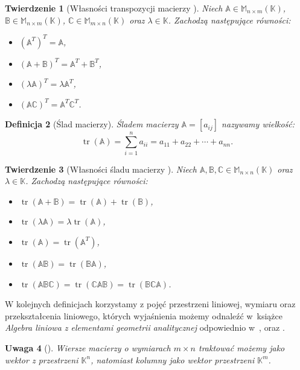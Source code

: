 \documentclass[12pt,a4paper]{report}
\newtheorem{df}{Definicja}[chapter]
\newtheorem{tw}[df]{Twierdzenie}
\newtheorem{uwaga}[df]{Uwaga}
\newcommand{\setK}{\mathbb{K}}
\newcommand{\tr}[1]{\operatorname{tr}\left({#1} \right)}
\begin{document}
\begin{tw}[Własności transpozycji macierzy {\citep[Sec 5.1 Tw. 5.1]{ealIII}}]
Niech $\mathbb{A} \in \mathbb{M}_{n \times m} (\setK)$, $\mathbb{B} \in \mathbb{M}_{n \times m} (\setK)$, $\mathbb{C} \in \mathbb{M}_{m \times n} (\setK)$ oraz $\lambda \in \setK$.
Zachodzą następujące równości:
\begin{itemize}
\item $(\mathbb{A}^T)^T = \mathbb{A}$,
\item $(\mathbb{A} + \mathbb{B})^T = \mathbb{A}^T + \mathbb{B}^T$,
\item $(\lambda \mathbb{A})^T = \lambda \mathbb{A}^T$,
\item $(\mathbb{A}\mathbb{C})^T = \mathbb{A}^T \mathbb{C}^T$.
\end{itemize}
\end{tw}

\begin{df}[Ślad macierzy]{\citep[Sec 6.4]{ealIII}}
Śladem macierzy  $\mathbb{A} = [a_{ij}]$ nazywamy wielkość:
$$
\tr{\mathbb{A}} = \sum_{i=1}^n a_{ii} = a_{11} + a_{22} + \cdots + a_{nn}.
$$
\end{df}


\begin{tw}[Własności śladu macierzy {\citep[Sec 6.4]{ealIII}}]
Niech $\mathbb{A}, \mathbb{B}, \mathbb{C} \in \mathbb{M}_{n \times n} (\setK)$ oraz $\lambda \in \setK$.
Zachodzą następujące równości:
\begin{itemize}
\item $\tr{\mathbb{A} + \mathbb{B}} = \tr{\mathbb{A}} + \tr{\mathbb{B}}$,
\item $\tr{\lambda \mathbb{A}} = \lambda \tr{\mathbb{A}}$,
\item $\tr{\mathbb{A}} =\tr{\mathbb{A}^T}$,
\item $\tr{\mathbb{A} \mathbb{B}}  = \tr{\mathbb{B} \mathbb{A}} $,
\item $\tr{\mathbb{A} \mathbb{B} \mathbb{C}}  = \tr{\mathbb{C} \mathbb{A} \mathbb{B}} = \tr{\mathbb{B} \mathbb{C} \mathbb{A}}$.
\end{itemize}
\end{tw}

W kolejnych definicjach korzystamy z pojęć przestrzeni liniowej, wymiaru oraz przekształcenia liniowego, których wyjaśnienia możemy odnaleźć w~książce \textit{Algebra liniowa z elementami geometrii analitycznej} odpowiednio w~{\citep[Sec 7.1]{alzega}}, {\citep[Sec 7.5]{alzega}} oraz {\citep[Sec 9.1]{alzega}}.

\begin{uwaga}[{\citep[Sec 8.1]{alzega}}]
Wiersze macierzy o wymiarach $m \times n$ traktować możemy jako wektor z przestrzeni $\setK^n$, natomiast kolumny jako wektor przestrzeni $\setK^m$.
\end{uwaga}
\end{document}
